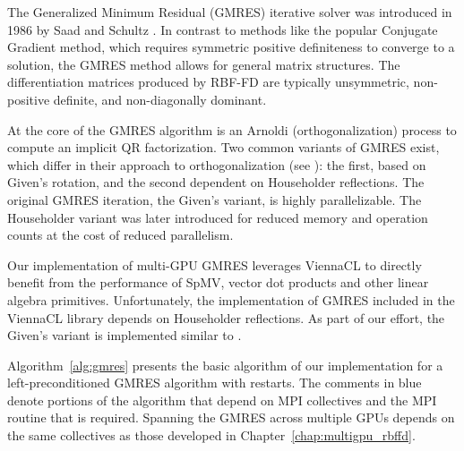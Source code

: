 The Generalized Minimum Residual (GMRES) iterative solver was introduced in 1986 by Saad and Schultz \cite{Saad1986}. In contrast to methods like the popular Conjugate Gradient method, which requires symmetric positive definiteness to converge to a solution, the GMRES method allows for general matrix structures. The differentiation matrices produced by RBF-FD are typically unsymmetric, non-positive definite, and non-diagonally dominant. 

At the core of the GMRES algorithm is an Arnoldi (orthogonalization) process to compute an implicit QR factorization. Two common variants of GMRES exist, which differ in their approach to orthogonalization (see \cite{Saad2003}): the first, based on Given's rotation, and the second dependent on Householder reflections. The original GMRES iteration, the Given's variant, is highly parallelizable. The Householder variant was later introduced for reduced memory and operation counts at the cost of reduced parallelism. 

Our implementation of multi-GPU GMRES leverages ViennaCL to directly benefit from the performance of SpMV, vector dot products and other linear algebra primitives. 
Unfortunately, the implementation of GMRES included in the ViennaCL library depends on Householder reflections. As part of our effort, the Given's variant is implemented similar to \cite{Bahi2011}. 

Algorithm~\ref{alg:gmres} presents the basic algorithm of our implementation for a left-preconditioned GMRES algorithm with restarts. The comments in blue denote portions of the algorithm that depend on MPI collectives and the MPI routine that is required. 
Spanning the GMRES across multiple GPUs depends on the same collectives as those developed in Chapter~\ref{chap:multigpu_rbffd}. 


%


%



